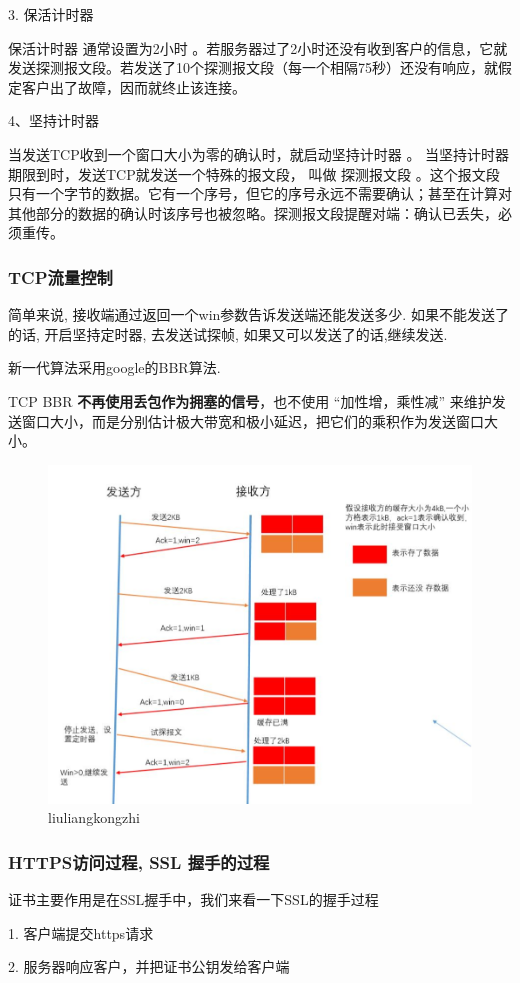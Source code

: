 \documentclass[UTF8]{ctexart}
\begin{document}
3. 保活计时器

保活计时器 通常设置为2小时 。若服务器过了2小时还没有收到客户的信息，它就发送探测报文段。若发送了10个探测报文段（每一个相隔75秒）还没有响应，就假定客户出了故障，因而就终止该连接。

4、坚持计时器

当发送TCP收到一个窗口大小为零的确认时，就启动坚持计时器 。 当坚持计时器期限到时，发送TCP就发送一个特殊的报文段， 叫做 探测报文段 。这个报文段只有一个字节的数据。它有一个序号，但它的序号永远不需要确认；甚至在计算对其他部分的数据的确认时该序号也被忽略。探测报文段提醒对端：确认已丢失，必须重传。
\subsubsection{TCP流量控制}
简单来说, 接收端通过返回一个win参数告诉发送端还能发送多少. 如果不能发送了的话, 开启坚持定时器, 去发送试探帧, 如果又可以发送了的话,继续发送. \par
新一代算法采用google的BBR算法.

TCP BBR \textbf{不再使用丢包作为拥塞的信号}，也不使用 “加性增，乘性减” 来维护发送窗口大小，而是分别估计极大带宽和极小延迟，把它们的乘积作为发送窗口大小。
\begin{figure}
	\centering
	\includegraphics[width=0.7\linewidth]{figures/liuliangkongzhi.png}
	\caption{liuliangkongzhi}
	\label{fig:liuliangkongzhi}
\end{figure}
\subsubsection{HTTPS访问过程, SSL 握手的过程}
证书主要作用是在SSL握手中，我们来看一下SSL的握手过程

1. 客户端提交https请求

2. 服务器响应客户，并把证书公钥发给客户端
\end{document}

